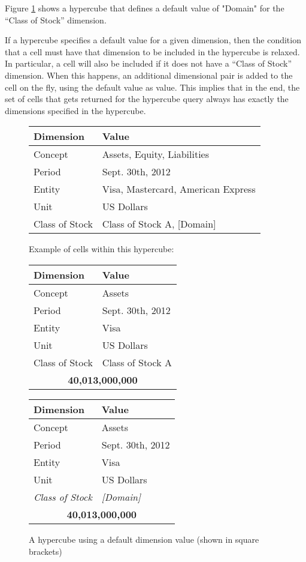 \documentclass{vldb}
\begin{document}
Figure \ref{fig-default} shows a hypercube that defines a default value of "Domain" for the ``Class of Stock'' dimension.

If a hypercube specifies a default value for a given dimension, then the condition that a cell must have that dimension to be included in the hypercube is relaxed. In particular, a cell will also be included if it does not have a ``Class of Stock'' dimension. When this happens, an additional dimensional pair is added to the cell on the fly, using the default value as value. This implies that in the end, the set of cells that gets returned for the hypercube query always has exactly the dimensions specified in the hypercube.

\begin{figure}
\caption{A hypercube using a default dimension value (shown in square brackets)}
\label{fig-default}
\begin{tabular}{|l|l|}
\hline
Dimension & Value \\
\hline
Concept & Assets, Equity, Liabilities \\
Period & Sept. 30th, 2012 \\
Entity & Visa, Mastercard, American Express \\
Unit & US Dollars \\
Class of Stock & Class of Stock A, [Domain] \\
\hline
\end{tabular}

Example of cells within this hypercube:

\begin{tabular}{|l|l|}
\hline
Dimension & Value \\
\hline
Concept & Assets \\
Period & Sept. 30th, 2012 \\
Entity & Visa \\
Unit & US Dollars \\
Class of Stock & Class of Stock A \\
\hline
\multicolumn{2}{|c|}{\textbf{40,013,000,000}} \\
\hline
\end{tabular}

\begin{tabular}{|l|l|}
\hline
Dimension & Value \\
\hline
Concept & Assets \\
Period & Sept. 30th, 2012 \\
Entity & Visa \\
Unit & US Dollars \\
\emph{Class of Stock} & \emph{[Domain]} \\
\hline
\multicolumn{2}{|c|}{\textbf{40,013,000,000}} \\
\hline
\end{tabular}
\end{figure}
\end{document}
